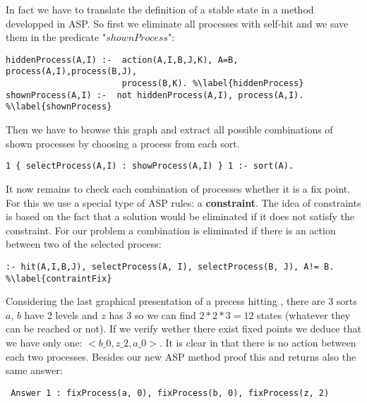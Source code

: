 In fact we have to translate the definition of a stable state in a method developped in ASP. So first we eliminate all processes with self-hit and we save them in the predicate "$shownProcess$":
\begin{lstlisting}
hiddenProcess(A,I) :-  action(A,I,B,J,K), A=B, process(A,I),process(B,J),
                       process(B,K). %\label{hiddenProcess}
shownProcess(A,I) :-  not hiddenProcess(A,I), process(A,I). %\label{shownProcess}
\end{lstlisting}
Then we have to browse this graph and extract all possible combinations of shown processes by choosing a process from each sort.
\begin{lstlisting}
1 { selectProcess(A,I) : showProcess(A,I) } 1 :- sort(A).
\end{lstlisting}
It now remains to check each combination of processes whether it is a fix point. For this we use a special type of ASP rules: a \textbf{constraint}. The idea of constraints is based on the fact that a solution would be eliminated if it does not satisfy the constraint. For our problem a combination is eliminated if there is an action between two of the selected process:
\begin{lstlisting}
:- hit(A,I,B,J), selectProcess(A, I), selectProcess(B, J), A!= B. %\label{contraintFix}
\end{lstlisting}

\begin{example}
Considering the last graphical presentation of a precess hitting , there are 3 sorts $a$, $b$ have 2 levels and $z$ has 3 so we can find $2*2*3 = 12$ states (whatever they can be reached or not). If we verify wether there exist fixed points we deduce that we have only one: $<b\_0, z\_2, a\_0>$. It is clear in  that there is no action between each two processes. Besides our new ASP method proof this and returns also the same answer:
\begin{tabbing}
 \texttt{
 Answer 1 : fixProcess(a, 0), fixProcess(b, 0), fixProcess(z, 2)
 }
\end{tabbing}
\end{example}